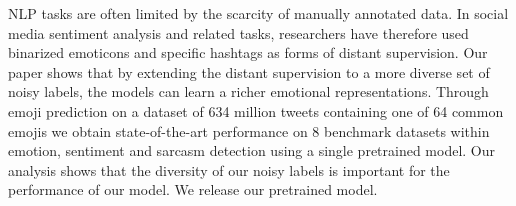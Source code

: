 NLP tasks are often limited by the scarcity of manually annotated data. In social media sentiment analysis and related tasks, researchers have therefore used binarized emoticons and specific hashtags as forms of distant supervision. Our paper shows that by extending the distant supervision to a more diverse set of noisy labels, the models can learn a richer emotional representations. Through emoji prediction on a dataset of 634 million tweets containing one of 64 common emojis we obtain state-of-the-art performance on 8 benchmark datasets within emotion, sentiment and sarcasm detection using a single pretrained model. Our analysis shows that the diversity of our noisy labels is important for the performance of our model. We release our pretrained model.
